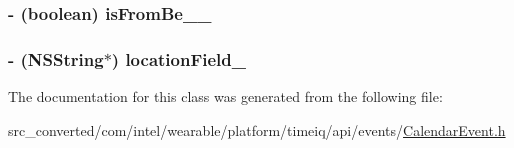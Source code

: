 \subsubsection[{is\+From\+Be\+\_\+\+\_\+}]{\setlength{\rightskip}{0pt plus 5cm}-\/ (boolean) is\+From\+Be\+\_\+\+\_\+}\label{interface_calendar_event___calendar_event_builder_a3da81d41d4bf1cc20df0310f14ad7f8c}
\hypertarget{interface_calendar_event___calendar_event_builder_a952b3b0d70a19d27d08e0b83dea7cc5b}{}
\subsubsection[{location\+Field\+\_\+}]{\setlength{\rightskip}{0pt plus 5cm}-\/ (N\+S\+String$\ast$) location\+Field\+\_\+}\label{interface_calendar_event___calendar_event_builder_a952b3b0d70a19d27d08e0b83dea7cc5b}


The documentation for this class was generated from the following file\+:\begin{DoxyCompactItemize}
\item 
src\+\_\+converted/com/intel/wearable/platform/timeiq/api/events/\hyperlink{_calendar_event_8h}{Calendar\+Event.\+h}\end{DoxyCompactItemize}
